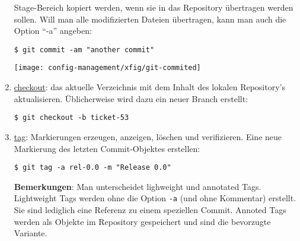 \begin{enumerate}
  Stage-Bereich kopiert werden, wenn sie in das Repository übertragen
  werden sollen. Will man alle modifizierten Dateien übertragen, kann
  man auch die Option ``-a'' angeben:
  \begin{lstlisting}
$ git commit -am "another commit"
  \end{lstlisting}
\begin{center}
\texttt{[image: config-management/xfig/git-commited]}
\end{center}
\newslide
\item \underline{checkout}: das aktuelle Verzeichnis mit dem
  Inhalt des lokalen Repository's aktualisieren.
Üblicherweise wird dazu ein neuer Branch erstellt:
  \begin{lstlisting}
$ git checkout -b ticket-53
  \end{lstlisting}
\newslide
\item \underline{tag}: Markierungen erzeugen, anzeigen, löschen und
  verifizieren. Eine neue Markierung des letzten Commit-Objektes erstellen:
\begin{lstlisting}
$ git tag -a rel-0.0 -m "Release 0.0"
\end{lstlisting}
{\bfseries Bemerkungen}: Man unterscheidet lighweight und annotated
Tags. Lightweight Tags werden ohne die Option \verb+-a+ (und ohne
Kommentar) erstellt. Sie sind lediglich eine Referenz zu einem
speziellen Commit. Annoted Tags werden als Objekte im Repository
gespeichert und sind die bevorzugte Variante.


\end{enumerate}
